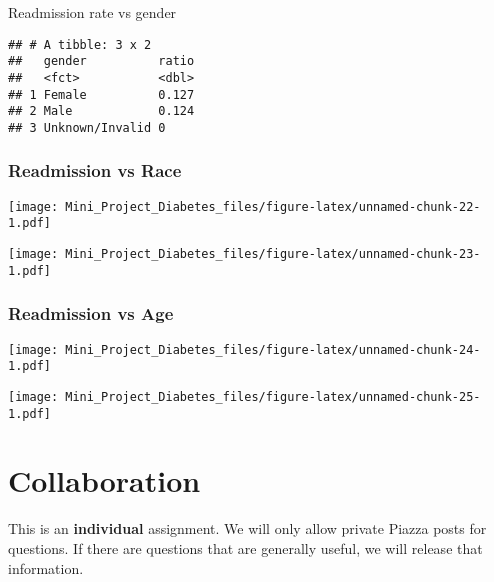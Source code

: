 \documentclass[]{article}
\newenvironment{Shaded}{\begin{snugshade}}{\end{snugshade}}
\newcommand{\KeywordTok}[1]{\textcolor[rgb]{0.13,0.29,0.53}{\textbf{#1}}}
\newcommand{\DataTypeTok}[1]{\textcolor[rgb]{0.13,0.29,0.53}{#1}}
\newcommand{\DecValTok}[1]{\textcolor[rgb]{0.00,0.00,0.81}{#1}}
\newcommand{\StringTok}[1]{\textcolor[rgb]{0.31,0.60,0.02}{#1}}
\newcommand{\OperatorTok}[1]{\textcolor[rgb]{0.81,0.36,0.00}{\textbf{#1}}}
\newcommand{\NormalTok}[1]{#1}
\begin{document}
Readmission rate vs gender

\begin{verbatim}
## # A tibble: 3 x 2
##   gender          ratio
##   <fct>           <dbl>
## 1 Female          0.127
## 2 Male            0.124
## 3 Unknown/Invalid 0
\end{verbatim}

\subsubsection{Readmission vs Race}\label{readmission-vs-race}

\texttt{[image: Mini\_Project\_Diabetes\_files/figure-latex/unnamed-chunk-22-1.pdf]}

\texttt{[image: Mini\_Project\_Diabetes\_files/figure-latex/unnamed-chunk-23-1.pdf]}

\subsubsection{Readmission vs Age}\label{readmission-vs-age}

\texttt{[image: Mini\_Project\_Diabetes\_files/figure-latex/unnamed-chunk-24-1.pdf]}

\begin{Shaded}
\end{Shaded}

\texttt{[image: Mini\_Project\_Diabetes\_files/figure-latex/unnamed-chunk-25-1.pdf]}

\section{Collaboration}\label{collaboration}

This is an \textbf{individual} assignment. We will only allow private
Piazza posts for questions. If there are questions that are generally
useful, we will release that information.
\end{document}
